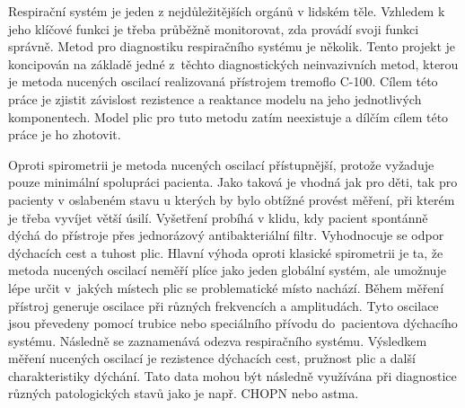 Respirační systém je jeden z nejdůležitějších orgánů v lidském těle. Vzhledem k jeho klíčové funkci je třeba průběžně monitorovat, zda provádí svoji funkci správně. 
Metod pro diagnostiku respiračního systému je několik. Tento projekt je koncipován na základě jedné z~těchto diagnostických neinvazivních metod, kterou je metoda nucených oscilací realizovaná přístrojem tremoflo C-100. Cílem této práce je zjistit závislost rezistence a reaktance modelu na jeho jednotlivých komponentech. \cite{Vlcek2018}
Model plic pro tuto metodu zatím neexistuje a dílčím cílem této práce je ho zhotovit. 


Oproti spirometrii je metoda nucených oscilací přístupnější, protože vyžaduje pouze minimální spolupráci pacienta. Jako taková je vhodná jak pro děti, tak pro pacienty v oslabeném stavu u kterých by bylo obtížné provést měření, při kterém je třeba vyvíjet větší úsilí. \cite{Vlcek2018} Vyšetření probíhá v klidu, kdy pacient spontánně dýchá do přístroje přes jednorázový antibakteriální filtr. Vyhodnocuje se odpor dýchacích cest a tuhost plic. \cite{Vlcek2018}
Hlavní výhoda oproti klasické spirometrii je ta, že metoda nucených oscilací neměří plíce jako jeden globální systém, ale umožnuje lépe určit v~jakých místech plic se problematické místo nachází. \cite{Vlcek2018}
Během měření přístroj generuje oscilace při různých frekvencích a amplitudách. Tyto oscilace jsou převedeny pomocí trubice nebo speciálního přívodu do~pacientova dýchacího systému. Následně se zaznamenává odezva respiračního systému. Výsledkem měření nucených oscilací je rezistence dýchacích cest, pružnost plic a další charakteristiky dýchání. Tato data mohou být následně využívána při diagnostice různých patologických stavů jako je např. CHOPN nebo astma. \cite{Vlcek2018}
